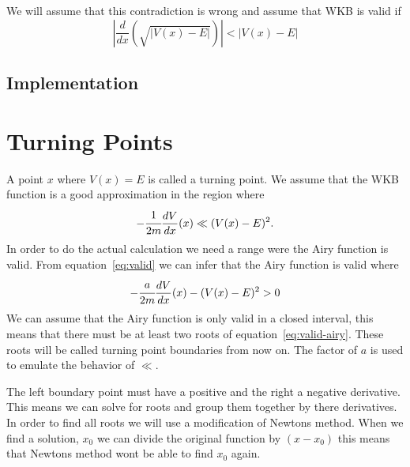 \documentclass[11pt,DIV=10,final]{scrreprt} %
\newcommand{\deriv}[2]{%
  \frac{d#1}{d#2}
}
\begin{document}
We will assume that this contradiction is wrong and assume that WKB is valid if
\[
  \left|\frac{d}{dx}(\sqrt{|V(x) - E|})\right| < |V(x) - E|
\]

\subsection{Implementation}

\section{Turning Points}
A point $x$ where $V(x) = E$ is called a turning point. We assume that the WKB function is a good approximation in the region where
\begin{align}
  \label{eq:valid}
  -\cfrac{1}{2m} \deriv{V}{x}(x) \ll (V(x) - E)^{2}.
\end{align}
In order to do the actual calculation we need a range were the Airy function is valid.
From equation~\ref{eq:valid} we can infer that the Airy function is valid where
\begin{align}
  \label{eq:valid-airy}
  -\cfrac{a}{2m} \deriv{V}{x}(x) - (V(x) - E)^{2} > 0
\end{align}
We can assume that the Airy function is only valid in a closed interval, this means that there must be at least two roots of equation~\ref{eq:valid-airy}. These roots will be called turning point boundaries from now on. The factor of $a$ is used to emulate the behavior of $\ll$.

The left boundary point must have a positive and the right a negative derivative. This means we can solve for roots and group them together by there derivatives.
\\
In order to find all roots we will use a modification of Newtons method. When we find a solution, $x_{0}$ we can divide the original function by $(x - x_{0})$ this means that Newtons method wont be able to find $x_{0}$ again.
\end{document}
